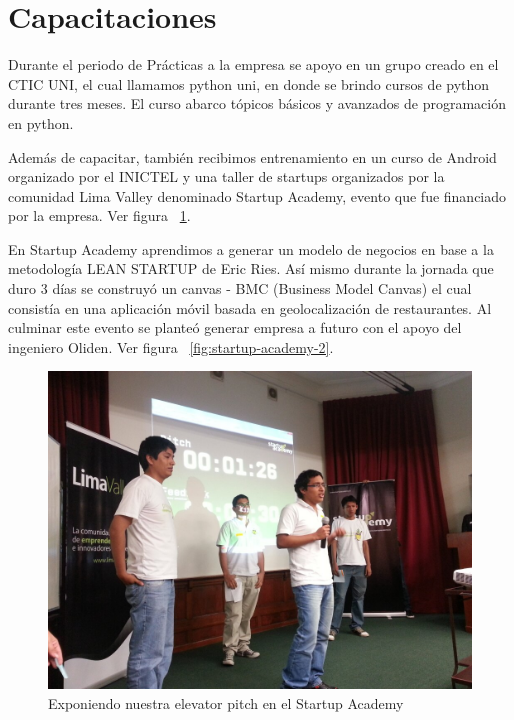 \clearpage


\section{Capacitaciones}

Durante el periodo de Prácticas a la empresa se apoyo en un grupo creado en el CTIC UNI, el cual llamamos python uni, en donde se brindo cursos de python durante tres meses. El curso abarco tópicos básicos y avanzados de programación en python.

Además de capacitar, también recibimos entrenamiento en un curso de Android organizado por el INICTEL y una taller de startups organizados por la comunidad Lima Valley denominado Startup Academy, evento que fue financiado por la empresa. Ver figura ~\ref{fig:startup-academy}.

En Startup Academy aprendimos a generar un modelo de negocios en base a la metodología LEAN STARTUP de Eric Ries. Así mismo durante la jornada que duro 3 días se construyó un canvas - BMC (Business Model Canvas) el cual consistía en una aplicación móvil basada en geolocalización de restaurantes. Al culminar este evento se planteó generar empresa a futuro con el apoyo del ingeniero Oliden. Ver figura ~\ref{fig:startup-academy-2}.

\begin{figure}[h!]
  \centering
  \includegraphics[scale=0.3]{images/activities/capacitaciones/startup-academy.jpg}
  \caption{Exponiendo nuestra elevator pitch en el Startup Academy}
  \label{fig:startup-academy}
\end{figure}

